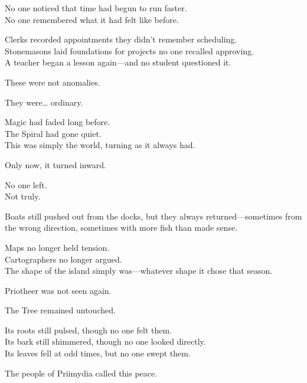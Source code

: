 \documentclass[12pt]{article}
\begin{document}
\vspace{0.5em}
No one noticed that time had begun to run faster.\\
No one remembered what it had felt like before.

\vspace{0.5em}
Clerks recorded appointments they didn’t remember scheduling.\\
Stonemasons laid foundations for projects no one recalled approving.\\
A teacher began a lesson again---and no student questioned it.

\vspace{0.5em}
These were not anomalies.

\vspace{0.5em}
They were\ldots{} ordinary.

\vspace{0.5em}
Magic had faded long before.\\
The Spiral had gone quiet.\\
This was simply the world, turning as it always had.

\vspace{0.5em}
Only now, it turned inward.

\vspace{0.5em}
No one left.\\
Not truly.

\vspace{0.5em}
Boats still pushed out from the docks, but they always returned---sometimes from the wrong direction, sometimes with more fish than made sense.

\vspace{0.5em}
Maps no longer held tension.\\
Cartographers no longer argued.\\
The shape of the island simply was---whatever shape it chose that season.

\vspace{0.5em}
Priotheer was not seen again.

\vspace{0.5em}
The Tree remained untouched.

\vspace{0.5em}
Its roots still pulsed, though no one felt them.\\
Its bark still shimmered, though no one looked directly.\\
Its leaves fell at odd times, but no one swept them.

\vspace{0.5em}
The people of Priimydia called this peace.
\end{document}
